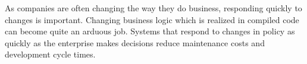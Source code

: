 As companies are often changing the way they do business,  responding
quickly to changes is important.  Changing business logic which
is realized in compiled code can become quite an arduous job.  Systems
that respond to changes in policy as quickly as the enterprise makes 
decisions reduce maintenance costs and development cycle times.

